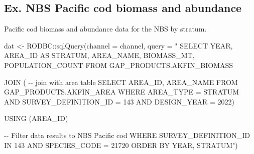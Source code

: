 \documentclass[
  letterpaper,
  oneside,
  open=any]{scrbook}
\newenvironment{Shaded}{\begin{snugshade}}{\end{snugshade}}
\newcommand{\AttributeTok}[1]{\textcolor[rgb]{0.40,0.45,0.13}{#1}}
\newcommand{\FunctionTok}[1]{\textcolor[rgb]{0.28,0.35,0.67}{#1}}
\newcommand{\NormalTok}[1]{\textcolor[rgb]{0.00,0.23,0.31}{#1}}
\newcommand{\OtherTok}[1]{\textcolor[rgb]{0.00,0.23,0.31}{#1}}
\newcommand{\SpecialCharTok}[1]{\textcolor[rgb]{0.37,0.37,0.37}{#1}}
\newcommand{\StringTok}[1]{\textcolor[rgb]{0.13,0.47,0.30}{#1}}
\begin{document}
\subsection{Ex. NBS Pacific cod biomass and
abundance}\label{ex.-nbs-pacific-cod-biomass-and-abundance}

Pacific cod biomass and abundance data for the NBS by stratum.

\begin{Shaded}
\begin{Highlighting}[]
\NormalTok{dat }\OtherTok{\textless{}{-}}\NormalTok{ RODBC}\SpecialCharTok{::}\FunctionTok{sqlQuery}\NormalTok{(}\AttributeTok{channel =}\NormalTok{ channel, }
                       \AttributeTok{query =} 
                         \StringTok{"}
\StringTok{SELECT YEAR, AREA\_ID AS STRATUM, AREA\_NAME, BIOMASS\_MT, POPULATION\_COUNT }
\StringTok{FROM GAP\_PRODUCTS.AKFIN\_BIOMASS}

\StringTok{JOIN ( {-}{-} join with area table}
\StringTok{SELECT AREA\_ID, AREA\_NAME}
\StringTok{FROM GAP\_PRODUCTS.AKFIN\_AREA}
\StringTok{WHERE AREA\_TYPE = \textquotesingle{}STRATUM\textquotesingle{}}
\StringTok{AND SURVEY\_DEFINITION\_ID = 143}
\StringTok{AND DESIGN\_YEAR = 2022)}

\StringTok{USING (AREA\_ID)}

\StringTok{{-}{-} Filter data results to NBS Pacific cod}
\StringTok{WHERE SURVEY\_DEFINITION\_ID IN 143 }
\StringTok{AND SPECIES\_CODE = 21720}
\StringTok{ORDER BY YEAR, STRATUM"}\NormalTok{)}
\end{Highlighting}
\end{Shaded}
\end{document}
